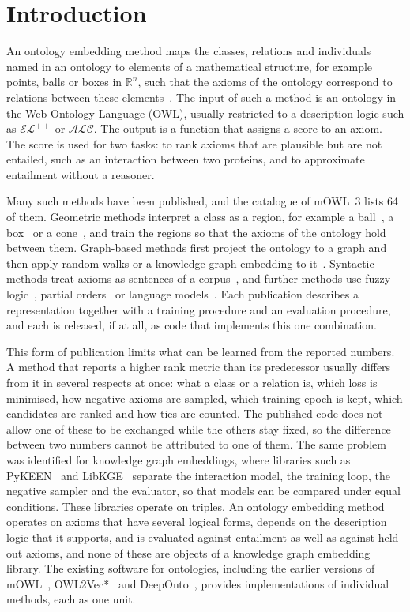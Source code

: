 \documentclass[runningheads]{llncs}
\newcommand{\ELpp}{\ensuremath{\mathcal{EL}^{++}}}
\newcommand{\ALC}{\ensuremath{\mathcal{ALC}}}
\begin{document}
\section{Introduction}

An ontology embedding method maps the classes, relations and individuals named in an
ontology to elements of a mathematical structure, for example points, balls or boxes in
$\mathbb{R}^n$, such that the axioms of the ontology correspond to relations between
these elements~\cite{chen2025}. The input of such a method is an ontology in the Web
Ontology Language (OWL), usually restricted to a description logic such as \ELpp{} or
\ALC. The output is a function that assigns a score to an axiom. The score is used for
two tasks: to rank axioms that are plausible but are not entailed, such as an
interaction between two proteins, and to approximate entailment without a reasoner.

Many such methods have been published, and the catalogue of mOWL~3 lists 64 of them.
Geometric methods interpret a class as
a region, for example a ball~\cite{kulmanov2019}, a box~\cite{peng2020,xiong2022,jackermeier2024}
or a cone~\cite{ozcep2023}, and train the regions so that the axioms of the ontology
hold between them. Graph-based methods first project the ontology to a graph and then
apply random walks or a knowledge graph embedding to it~\cite{chen2020,chen2020b}.
Syntactic methods treat axioms as sentences of a corpus~\cite{smaili2018}, and further
methods use fuzzy logic~\cite{falcon2022}, partial orders~\cite{vendrov2016} or language
models~\cite{yang2025ont}. Each publication describes a representation together with a
training procedure and an evaluation procedure, and each is released, if at all, as code
that implements this one combination.

This form of publication limits what can be learned from the reported numbers. A method
that reports a higher rank metric than its predecessor usually differs from it in several
respects at once: what a class or a relation is, which loss is minimised, how negative
axioms are sampled, which training epoch is kept, which candidates are ranked and how
ties are counted. The published code does not allow one of these to be exchanged while
the others stay fixed, so the difference between two numbers cannot be attributed to
one of them. The same problem was identified for knowledge graph embeddings, where
libraries such as PyKEEN~\cite{ali2021} and LibKGE~\cite{broscheit2020} separate the
interaction model, the training loop, the negative sampler and the evaluator, so that
models can be compared under equal conditions. These libraries operate on triples. An ontology embedding method operates on axioms that have several
logical forms, depends on the description logic that it supports, and is evaluated
against entailment as well as against held-out axioms, and none of these are objects of
a knowledge graph embedding library. The existing software for ontologies, including the
earlier versions of mOWL~\cite{zhapa2022mowl}, OWL2Vec*~\cite{chen2020b} and
DeepOnto~\cite{he2024deeponto}, provides implementations of individual methods, each as
one unit.
\end{document}
